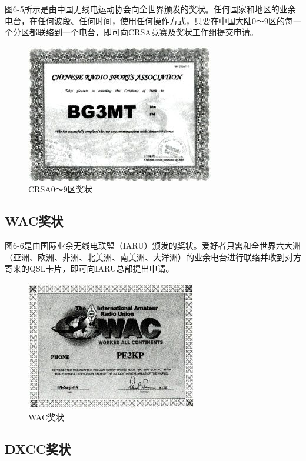 \documentclass[12pt,UTF8]{ctexbook}
\begin{document}
图6-5所示是由中国无线电运动协会向全世界颁发的奖状。任何国家和地区的业余电台，在任何波段、任何时间，使用任何操作方式，只要在中国大陆0～9区的每一个分区都联络到一个电台，即可向CRSA竞赛及奖状工作组提交申请。

\begin{figure}[htbp]
	\centering
	\includegraphics[width=0.7\linewidth]{75}
	\caption{CRSA0～9区奖状}
	\label{fig:1}
\end{figure}

\subsection{WAC奖状}

图6-6是由国际业余无线电联盟（IARU）颁发的奖状。爱好者只需和全世界六大洲（亚洲、欧洲、非洲、北美洲、南美洲、大洋洲）的业余电台进行联络并收到对方寄来的QSL卡片，即可向IARU总部提出申请。

\begin{figure}[htbp]
	\centering
	\includegraphics[width=0.7\linewidth]{76}
	\caption{WAC奖状}
	\label{fig:1}
\end{figure}

\subsection{DXCC奖状}
\end{document}

